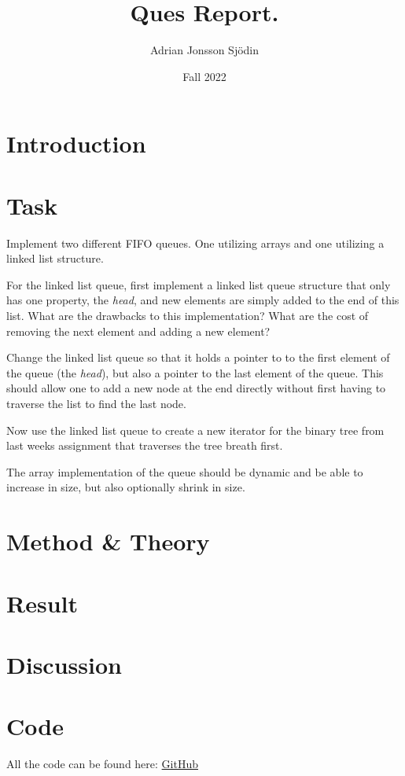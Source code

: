 \documentclass[a4paper,11pt]{article}
\begin{document}
\title{
    \textbf{Ques Report.}
}
\author{Adrian Jonsson Sjödin}
\date{Fall 2022}

\maketitle

\section{Introduction}


\section{Task}
Implement two different FIFO queues. One utilizing arrays and one utilizing a linked list structure.

For the linked list queue, first implement a linked list queue structure that only has one property,
the \textit{head}, and new elements are simply added to the end of this list. What are the drawbacks
to this implementation? What are the cost of removing the next element and adding a new element?

Change the linked list queue so that it holds a pointer to to the first element of the queue
(the \textit{head}), but also a pointer to the last element of the queue. This should allow one
to add a new node at the end directly without first having to traverse the list to find the last
node.

Now use the linked list queue to create a new iterator for the binary tree from last weeks assignment
that traverses the tree breath first.

The array implementation of the queue  should be dynamic and be able to increase in size, but also
optionally shrink in size.
\section{Method \& Theory}



\section{Result}


\section{Discussion}


\newpage
\FloatBarrier
\section*{Code}
All the code can be found here: \href{https://github.com/adrian-jonsson-sjoedin/ID1021-AlgoData/tree/main/Tasks/Trees/src}{GitHub}
\end{document}
